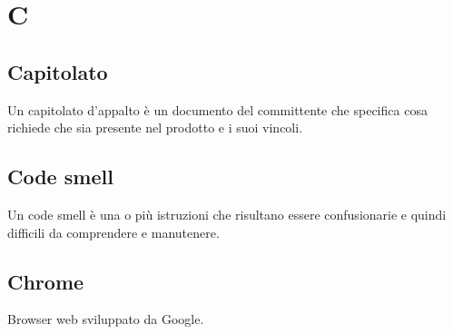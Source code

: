 \section{C}
	\subsection{Capitolato}
		Un capitolato d'appalto è un documento del committente che specifica cosa richiede che sia presente nel prodotto e i suoi vincoli.
	\subsection{Code smell} 
		Un code smell è una o più istruzioni che risultano essere confusionarie e quindi difficili da comprendere e manutenere.
	\subsection{Chrome}  
		Browser web sviluppato da Google.

\newpage

